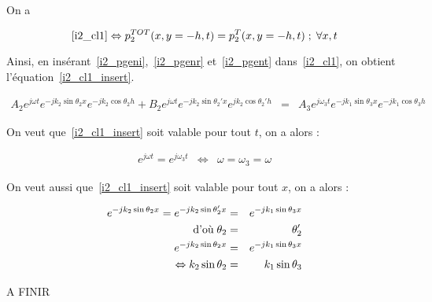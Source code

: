 On a 

\begin{equation*}
\eqref{i2_cl1} \Leftrightarrow p^{TOT}_2(x,y=-h,t) = p^T_2(x, y=-h, t) \;;\; \forall x,t 
\end{equation*}

Ainsi, en insérant~\eqref{i2_pgeni},~\eqref{i2_pgenr} et~\eqref{i2_pgent} dans~\eqref{i2_cl1}, on obtient
l'équation~\eqref{i2_cl1_insert}.

\begin{eqnarray}
    A_2e^{j\omega t}e^{-jk_2\sin\theta_2x}e^{-jk_2\cos\theta_2h} + B_2e^{j\omega t}e^{-jk_2\sin\theta_2'x}e^{jk_2\cos\theta_2'h} & = &
    A_3e^{j\omega_3t}e^{-jk_1\sin\theta_3x}e^{-jk_1\cos\theta_3h} \label{i2_cl1_insert}
\end{eqnarray}

On veut que~\eqref{i2_cl1_insert} soit valable pour tout $t$, on a alors :

\begin{eqnarray}
    e^{j\omega t} = e^{j\omega_3t} & \Leftrightarrow &\omega = \omega_3 = \omega \label{i2_pulsrel}
\end{eqnarray}

On veut aussi que~\eqref{i2_cl1_insert} soit valable pour tout $x$, on a alors :

\begin{eqnarray}
    e^{-jk_2\sin\theta_2x} = e^{-jk_2\sin\theta_2'x} & = & e^{-jk_1\sin\theta_3x}\notag\\
    \text{d'où}\;\theta_2 & = & \theta_2'\label{i2_thetarel}\\
    e^{-jk_2\sin\theta_2x} & = & e^{-jk_1\sin\theta_3x}\notag\\
    \Leftrightarrow k_2\sin\theta_2 & = & k_1\sin\theta_3 \label{i2_snellrel}
\end{eqnarray}

A FINIR
